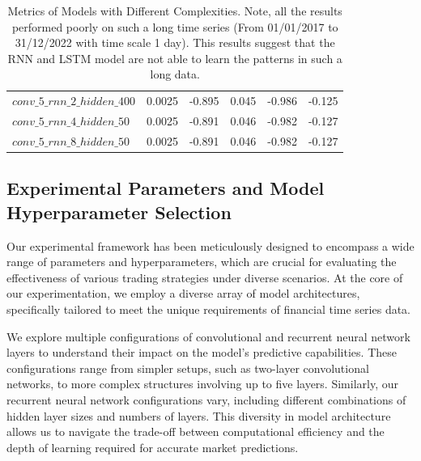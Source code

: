 \documentclass[10pt,twocolumn,letterpaper]{article}
\begin{document}
\begin{table}[ht]
\begin{tabular}{lccccc}
      $conv\_5\_rnn\_2\_hidden\_400$  & 0.0025 & -0.895              & 0.045                    & -0.986             & -0.125                  \\
      $conv\_5\_rnn\_4\_hidden\_50$   & 0.0025 & -0.891              & 0.046                    & -0.982             & -0.127                  \\
      $conv\_5\_rnn\_8\_hidden\_50$   & 0.0025 & -0.891              & 0.046                    & -0.982             & -0.127                  \\
   \end{tabular}
   \caption{Metrics of Models with Different Complexities. Note, all the results performed poorly on such a long time series (From 01/01/2017 to 31/12/2022 with time scale 1 day). This results suggest that the RNN and LSTM model are not able to learn the patterns in such a long data.}
   \label{tab:performance_metrics_transposed}
\end{table}

\subsection{Experimental Parameters and Model Hyperparameter Selection}

Our experimental framework has been meticulously designed to encompass a wide range of parameters and hyperparameters, which are crucial for evaluating the effectiveness of various trading strategies under diverse scenarios. At the core of our experimentation, we employ a diverse array of model architectures, specifically tailored to meet the unique requirements of financial time series data.

We explore multiple configurations of convolutional and recurrent neural network layers to understand their impact on the model's predictive capabilities. These configurations range from simpler setups, such as two-layer convolutional networks, to more complex structures involving up to five layers. Similarly, our recurrent neural network configurations vary, including different combinations of hidden layer sizes and numbers of layers. This diversity in model architecture allows us to navigate the trade-off between computational efficiency and the depth of learning required for accurate market predictions.
\end{document}
